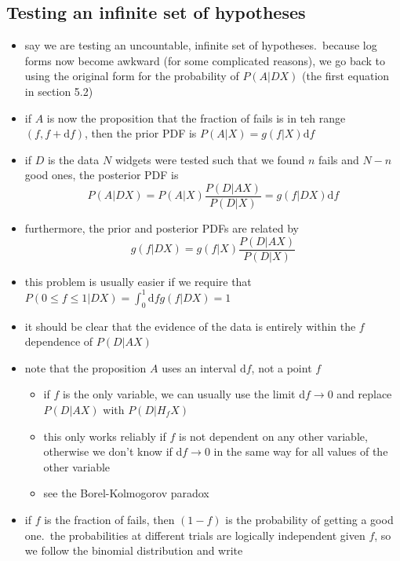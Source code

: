 \documentclass[../jaynes_prob_theory_notes.tex]{subfiles}
\begin{document}
\subsection{Testing an infinite set of hypotheses}
    \begin{itemize}
        \item say we are testing an uncountable, infinite set of hypotheses.\ because log forms now become awkward (for some complicated reasons), we go back to using the original form for the probability of $P(A|DX)$ (the first equation in section 5.2)
        \item if $A$ is now the proposition that the fraction of fails is in teh range $(f, f + \mathrm{d}f)$, then the prior PDF is $P(A|X) = g(f|X)\mathrm{d}f$
        \item if $D$ is the data $N$ widgets were tested such that we found $n$ fails and $N-n$ good ones, the posterior PDF is 
            \begin{equation*}
                P(A|DX) = P(A|X) \frac{P(D|AX)}{P(D|X)} = g(f|DX)\mathrm{d}f
            \end{equation*}
        \item furthermore, the prior and posterior PDFs are related by
            \begin{equation*}
                g(f|DX) = g(f|X) \frac{P(D|AX)}{P(D|X)}
            \end{equation*}
        \item this problem is usually easier if we require that $P(0 \leq f \leq 1|DX) = \int^1_0 \mathrm{d}fg(f|DX) = 1$
        \item it should be clear that the evidence of the data is entirely within the $f$ dependence of $P(D|AX)$
        \item note that the proposition $A$ uses an interval $\mathrm{d}f$, not a point $f$ 
            \begin{itemize}
                \item if $f$ is the only variable, we can usually use the limit d$f \rightarrow 0$ and replace $P(D|AX)$ with $P(D|H_{f}X)$
                \item this only works reliably if $f$ is not dependent on any other variable, otherwise we don't know if d$f \rightarrow 0$ in the same way for all values of the other variable
                \item see the Borel-Kolmogorov paradox
            \end{itemize}
        \item if $f$ is the fraction of fails, then $(1-f)$ is the probability of getting a good one.\ the probabilities at different trials are logically independent given $f$, so we follow the binomial distribution and write

\end{itemize}
\end{document}
